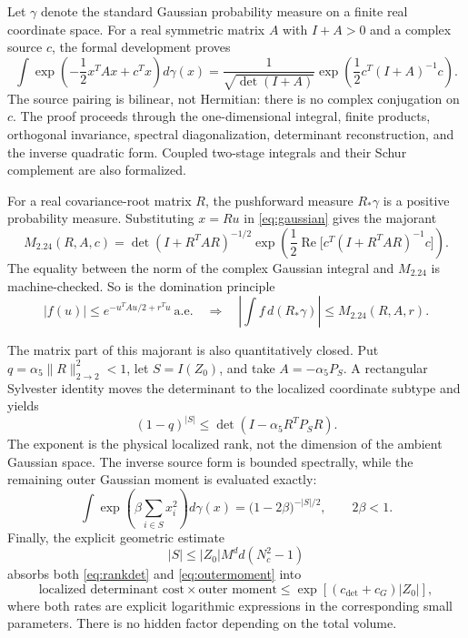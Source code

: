 \documentclass[11pt,a4paper]{article}
\theoremstyle{definition}
\newcommand{\opnorm}[1]{\lVert #1\rVert_{2\to2}}
\newcommand{\gauss}{\gamma}
\begin{document}
Let $\gauss$ denote the standard Gaussian probability measure on a finite
real coordinate space.  For a real symmetric matrix $A$ with $I+A>0$ and a
complex source $c$, the formal development proves
\begin{equation}\label{eq:gaussian}
 \int \exp\!\left(-\frac12x^TAx+c^Tx\right)d\gauss(x)
 =\frac{1}{\sqrt{\det(I+A)}}
   \exp\!\left(\frac12c^T(I+A)^{-1}c\right).
\end{equation}
The source pairing is bilinear, not Hermitian: there is no complex conjugation
on $c$.  The proof proceeds through the one-dimensional integral, finite
products, orthogonal invariance, spectral diagonalization, determinant
reconstruction, and the inverse quadratic form.  Coupled two-stage integrals
and their Schur complement are also formalized.

For a real covariance-root matrix $R$, the pushforward measure
$R_*\gauss$ is a positive probability measure.  Substituting $x=Ru$ in
\eqref{eq:gaussian} gives the majorant
\begin{equation}\label{eq:majorant}
 M_{2.24}(R,A,c)=
 \det(I+R^TAR)^{-1/2}
 \exp\!\left(\frac12\operatorname{Re}
 \bigl[c^T(I+R^TAR)^{-1}c\bigr]\right).
\end{equation}
The equality between the norm of the complex Gaussian integral and
$M_{2.24}$ is machine-checked.  So is the domination principle
\begin{equation}\label{eq:domination}
 |f(u)|\le e^{-u^TAu/2+r^Tu}\ \text{a.e.}
 \quad\Longrightarrow\quad
 \left|\int f\,d(R_*\gauss)\right|\le M_{2.24}(R,A,r).
\end{equation}

The matrix part of this majorant is also quantitatively closed.  Put
$q=\alpha_5\opnorm R^2<1$, let $S=I(Z_0)$, and take
$A=-\alpha_5P_S$.  A rectangular Sylvester identity moves the determinant to
the localized coordinate subtype and yields
\begin{equation}\label{eq:rankdet}
 (1-q)^{|S|}
 \le \det(I-\alpha_5R^TP_SR).
\end{equation}
The exponent is the physical localized rank, not the dimension of the ambient
Gaussian space.  The inverse source form is bounded spectrally, while the
remaining outer Gaussian moment is evaluated exactly:
\begin{equation}\label{eq:outermoment}
 \int \exp\!\left(\beta\sum_{i\in S}x_i^2\right)d\gauss(x)
 =\bigl(1-2\beta\bigr)^{-|S|/2},\qquad 2\beta<1.
\end{equation}
Finally, the explicit geometric estimate
\begin{equation}\label{eq:Scard}
 |S|\le |Z_0|M^d d(N_c^2-1)
\end{equation}
absorbs both \eqref{eq:rankdet} and \eqref{eq:outermoment} into
\begin{equation}\label{eq:fullmajorant}
 \text{localized determinant cost}\times\text{outer moment}
 \le \exp\!\left[(c_{\det}+c_G)|Z_0|\right],
\end{equation}
where both rates are explicit logarithmic expressions in the corresponding
small parameters.  There is no hidden factor depending on the total volume.
\end{document}
